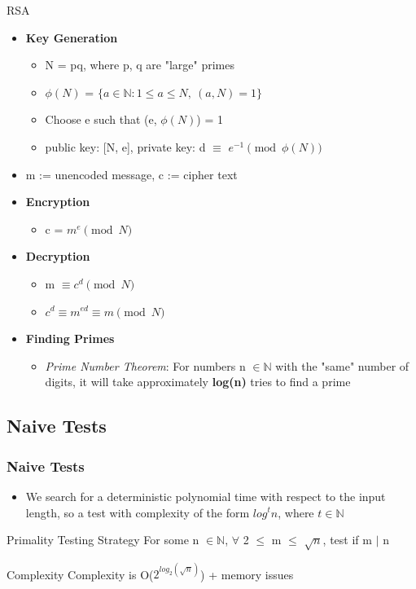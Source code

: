 \documentclass{beamer}
\begin{document}
\begin{frame}{RSA}
    \begin{itemize}
        \item \textbf{Key Generation}
        \begin{itemize}
            \item N = pq, where p, q are "large" primes
            \item $\phi(N)$ = $\{a \in \mathbb{N}: 1 \leq a \leq N, \ (a, N)
            = 1\}$
            \item Choose e such that (e, $\phi(N)$) = 1
            \item public key: [N, e], private key: d $\equiv$ $e^{-1} \pmod {\phi(N)}$ 
        \end{itemize}
        \item m := unencoded message, c := cipher text
        \item \textbf{Encryption}
        \begin{itemize}
            \item c = $m^e \pmod N$
        \end{itemize}
        \item \textbf{Decryption}
        \begin{itemize}
            \item m $\equiv c^d \pmod N$
            \item $c^d \equiv m^{ed} \equiv m \pmod N$
        \end{itemize}
        \item \textbf{Finding Primes}
        \begin{itemize}
            \item \textit{Prime Number Theorem}: For numbers n $\in \mathbb{N}$ with the "same" number of digits, it will take approximately \textbf{log(n)} tries to find a prime
        \end{itemize}
    \end{itemize}
\end{frame}

\subsection{Naive Tests}

\begin{frame}
\frametitle{Naive Tests}
\begin{itemize}
    \item We search for a deterministic polynomial time with respect to the input length, so a test with complexity of the form $log^tn$, where $t \in \mathbb{N}$
\end{itemize}
\begin{block}{Primality Testing Strategy}
    For some n $\in \mathbb{N}$, $\forall$ 2 $\leq$ m $\leq$ $\sqrt{n}$, test if m $\vert$ n
\end{block}
\begin{alertblock}{Complexity}
    Complexity is O($2^{log_2(\sqrt{n})}$) + memory issues
\end{alertblock}

\end{frame}
\end{document}
